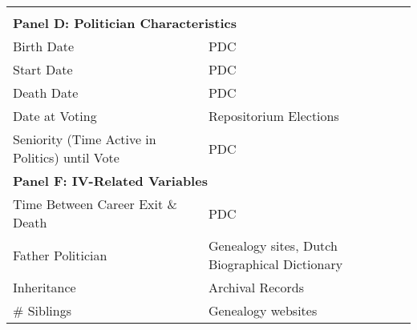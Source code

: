 \begin{table}[!ht]
\begin{tabular}{ll}
     & \\
    \multicolumn{2}{l}{\textbf{Panel D: Politician Characteristics}} \\ \hline
    Birth Date & PDC \\
    Start Date & PDC \\
    Death Date & PDC \\
    Date at Voting & Repositorium Elections \\
    Seniority (Time Active in Politics) until Vote & PDC \\
    \multicolumn{2}{l}{\textbf{Panel F: IV-Related Variables}} \\ \hline
    Time Between Career Exit \& Death & PDC \\
    Father Politician & Genealogy sites, Dutch Biographical Dictionary \\
    Inheritance & Archival Records \\
    \# Siblings & Genealogy websites
    \end{tabular}
\end{table}